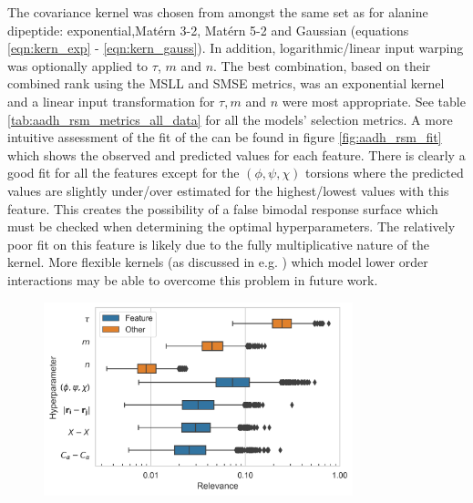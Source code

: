 The covariance kernel was chosen from amongst the same set as for alanine dipeptide: exponential,Mat\'{e}rn 3-2, Mat\'{e}rn 5-2 and  Gaussian (equations \ref{eqn:kern_exp} - \ref{eqn:kern_gauss}). In addition, logarithmic/linear input warping was optionally applied to $\tau$, $m$ and $n$. The best combination, based on their combined rank using the MSLL and SMSE metrics, was an exponential kernel and a linear input transformation for $\tau, m$ and $n$ were most appropriate. See table \ref{tab:aadh_rsm_metrics_all_data} for  all the models' selection metrics. A more intuitive assessment of the fit of the can be found in figure  \ref{fig:aadh_rsm_fit} which shows the observed and predicted values for each feature. There is clearly a good fit for all the features except for the $(\phi, \psi, \chi)$ torsions where the predicted values are slightly under/over estimated for the highest/lowest values with this feature. This creates the possibility of a false bimodal response surface which must be checked when determining the optimal hyperparameters.  The relatively poor fit on this feature is likely due to the fully multiplicative nature of the kernel. More flexible kernels (as discussed in e.g. \cite{duvenaud2011additive}) which model lower order interactions may be able to overcome this problem in future work. 

\begin{figure}
    \centering
    \includegraphics[width=0.8\textwidth]{chapters/msm_optimization/figures/AADH_relevance_d.png}
    \label{fig:aadh_relevance}
\end{figure}

